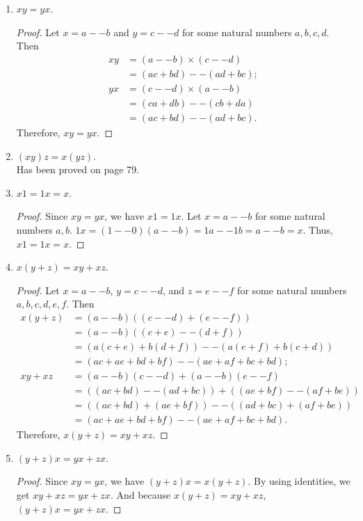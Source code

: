 \documentclass[12pt, letter]{article}
\begin{document}
\begin{enumerate}
\begin{proof}
    \end{proof}
    \item $xy=yx$.
    \begin{proof}
        Let $x=a--b$ and $y=c--d$ for some natural numbers $a,b,c,d$. Then 
        \begin{equation*}
            \begin{aligned}
                xy&=(a--b)\times (c--d)\\
                &=(ac+bd)--(ad+bc);\\
                yx&=(c--d)\times (a--b)\\
                &=(ca+db)--(cb+da)\\
                &=(ac+bd)--(ad+bc).
            \end{aligned}
        \end{equation*}
        Therefore, $xy=yx$.
    \end{proof}
    \item $(xy)z=x(yz)$.\\
    Has been proved on page 79.
    \item $x1=1x=x$.
    \begin{proof}
        Since $xy=yx$, we have $x1=1x$. Let $x=a--b$ for some natural numbers $a,b$. $1x=(1--0)(a--b)=1a--1b=a--b=x$. Thus, $x1=1x=x$.
    \end{proof}
    \item $x(y+z)=xy+xz$.
    \begin{proof}
        Let $x=a--b$, $y=c--d$, and $z=e--f$ for some natural numbers $a,b,c,d,e,f$. Then 
        \begin{equation*}
            \begin{aligned}
                x(y+z)&=(a--b)((c--d)+(e--f))\\
                &=(a--b)((c+e)--(d+f))\\
                &=(a(c+e)+b(d+f))--(a(e+f)+b(c+d))\\
                &=(ac+ae+bd+bf)--(ae+af+bc+bd);\\
                xy+xz&=(a--b)(c--d)+(a--b)(e--f)\\
                &=((ac+bd)--(ad+bc))+((ae+bf)--(af+be))\\
                &=((ac+bd)+(ae+bf))--((ad+bc)+(af+be))\\
                &=(ac+ae+bd+bf)--(ae+af+bc+bd).
            \end{aligned}
        \end{equation*}
        Therefore, $x(y+z)=xy+xz$.
    \end{proof}
    \item $(y+z)x=yx+zx$.
    \begin{proof}
        Since $xy=yx$, we have $(y+z)x=x(y+z)$. By using identities, we get $xy+xz=yx+zx$. And because $x(y+z)=xy+xz$, $(y+z)x=yx+zx$.
    \end{proof}
\end{enumerate}
\end{document}
